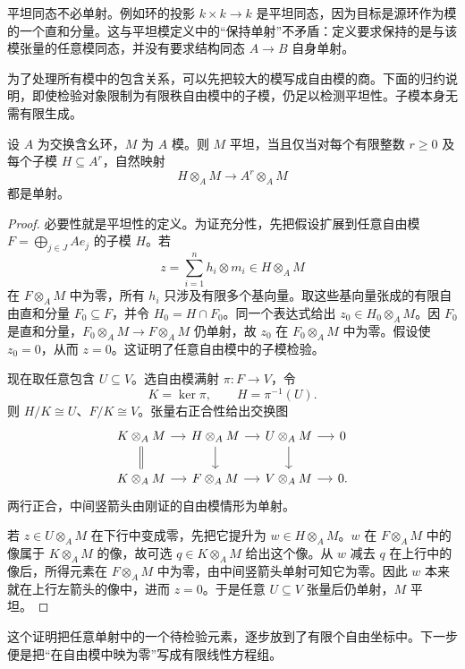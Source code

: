 平坦同态不必单射。例如环的投影 \(k\times k\to k\) 是平坦同态，因为目标是源环作为模的一个直和分量。这与平坦模定义中的“保持单射”不矛盾：定义要求保持的是与该模张量的任意模同态，并没有要求结构同态 \(A\to B\) 自身单射。

\ProseParagraphBreak

为了处理所有模中的包含关系，可以先把较大的模写成自由模的商。下面的归约说明，即使检验对象限制为有限秩自由模中的子模，仍足以检测平坦性。子模本身无需有限生成。

\begin{lemma}\label{g5:lem:flat-submodule-free-test}
	设 \(A\) 为交换含幺环，\(M\) 为 \(A\) 模。则 \(M\) 平坦，当且仅当对每个有限整数 \(r\geq0\) 及每个子模 \(H\subseteq A^r\)，自然映射
	\[
		H\otimes_A M\longrightarrow A^r\otimes_A M
	\]
	都是单射。
\end{lemma}
\begin{proof}
	必要性就是平坦性的定义。为证充分性，先把假设扩展到任意自由模 \(F=\bigoplus_{j\in J}Ae_j\) 的子模 \(H\)。若
	\[
		z=\sum_{i=1}^n h_i\otimes m_i\in H\otimes_A M
	\]
	在 \(F\otimes_A M\) 中为零，所有 \(h_i\) 只涉及有限多个基向量。取这些基向量张成的有限自由直和分量 \(F_0\subseteq F\)，并令 \(H_0=H\cap F_0\)。同一个表达式给出 \(z_0\in H_0\otimes_A M\)。因 \(F_0\) 是直和分量，\(F_0\otimes_A M\to F\otimes_A M\) 仍单射，故 \(z_0\) 在 \(F_0\otimes_A M\) 中为零。假设使 \(z_0=0\)，从而 \(z=0\)。这证明了任意自由模中的子模检验。

	现在取任意包含 \(U\subseteq V\)。选自由模满射 \(\pi:F\to V\)，令
	\[
		K=\ker\pi,\qquad H=\pi^{-1}(U).
	\]
	则 \(H/K\cong U\)、\(F/K\cong V\)。张量右正合性给出交换图
	\[
		\begin{tikzcd}[column sep=small]
			K\otimes_A M\arrow[r]\arrow[d,equal]&
			H\otimes_A M\arrow[r]\arrow[d]&
			U\otimes_A M\arrow[r]\arrow[d]&0\\
			K\otimes_A M\arrow[r]&
			F\otimes_A M\arrow[r]&
			V\otimes_A M\arrow[r]&0 .
		\end{tikzcd}
	\]
	两行正合，中间竖箭头由刚证的自由模情形为单射。

	若 \(z\in U\otimes_A M\) 在下行中变成零，先把它提升为 \(w\in H\otimes_A M\)。\(w\) 在 \(F\otimes_A M\) 中的像属于 \(K\otimes_A M\) 的像，故可选 \(q\in K\otimes_A M\) 给出这个像。从 \(w\) 减去 \(q\) 在上行中的像后，所得元素在 \(F\otimes_A M\) 中为零，由中间竖箭头单射可知它为零。因此 \(w\) 本来就在上行左箭头的像中，进而 \(z=0\)。于是任意 \(U\subseteq V\) 张量后仍单射，\(M\) 平坦。
\end{proof}

这个证明把任意单射中的一个待检验元素，逐步放到了有限个自由坐标中。下一步便是把“在自由模中映为零”写成有限线性方程组。

